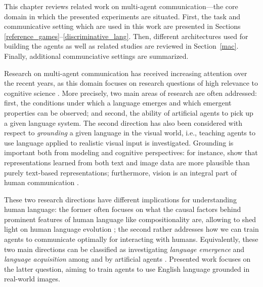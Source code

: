 
This chapter reviews related work on multi-agent communication---the core domain in which the presented experiments are situated. First, the task and communicative setting which are used in this work are presented in Sections \ref{reference_games}--\ref{discriminative_lang}. Then, different architectures used for building the agents as well as related studies are reviewed in Section~\ref{mac}. Finally, additional communciative settings are summarized.

Research on multi-agent communication has received increasing attention over the recent years, as this domain focuses on research questions of high relevance to cognitive science \parencite{lazaridou2020emergent}. More precisely, two main areas of research are often addressed: first, the conditions under which a language emerges and which emergent properties can be observed; and second, the ability of artificial agents to pick up a given language system. %
The second direction has also been considered with respect to \textit{grounding} a given language in the visual world, i.e., teaching agents to use language applied to realistic visual input is investigated. Grounding is important both from modeling and cognitive perspectives: for instance, \cite{bruni2014multimodal} show that representations learned from both text and image data are more plausible than purely text-based representations; furthermore, vision is an integral part of human communication \parencite{tomasello2010origins, harnad1990symbol, clark1991grounding}. 

These two research directions have different implications for understanding human language: the former often focuses on what the causal factors behind prominent features of human language like compositionality are, allowing to shed light on human language evolution \parencite{christiansen2003language, kirby2014iterated}; the second rather addresses how we can train agents to communicate optimally for interacting with humans. Equivalently, these two main directions can be classified as investigating \textit{language emergence} and \textit{language acquisition} among and by artificial agents \parencite{lazaridou2018emergence, lazaridou2020emergent}.
Presented work focuses on the latter question, aiming to train agents to use English language grounded in real-world images.

